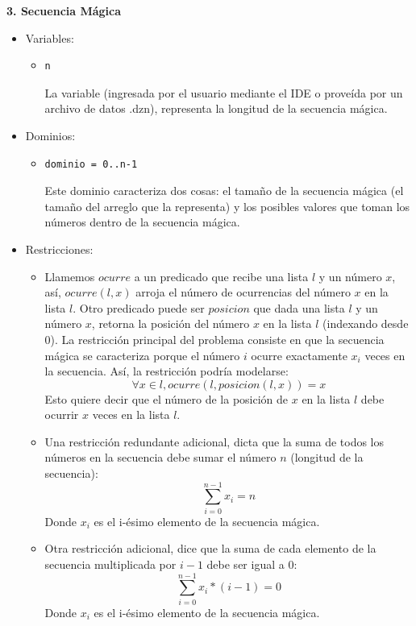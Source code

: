 \documentclass[12pt]{article}
\begin{document}
\newpage

\begin{flushleft}
\textbf{3. Secuencia Mágica}
\end{flushleft}

\begin{itemize}
\item Variables:
\begin{itemize}
\item \begin{verbatim}
n
\end{verbatim} La variable (ingresada por el usuario mediante el IDE o proveída por un archivo de datos .dzn), representa la longitud de la secuencia mágica.
\end{itemize}
\item Dominios:
\begin{itemize}
\item \begin{verbatim}
dominio = 0..n-1
\end{verbatim} Este dominio caracteriza dos cosas: el tamaño de la secuencia mágica (el tamaño del arreglo que la representa) y los posibles valores que toman los números dentro de la secuencia mágica.
\end{itemize}
\item Restricciones:
\begin{itemize}
\item Llamemos $ocurre$ a un predicado que recibe una lista $l$ y un número $x$, así, $ocurre(l,x)$ arroja el número de ocurrencias del número $x$ en la lista $l$. Otro predicado puede ser $posicion$ que dada una lista $l$ y un número $x$, retorna la posición del número $x$ en la lista $l$ (indexando desde 0). La restricción principal del problema consiste en que la secuencia mágica se caracteriza porque el número $i$ ocurre exactamente $x_{i}$ veces en la secuencia. Así, la restricción podría modelarse:
\begin{equation*}
\forall x \in l, ocurre(l, posicion(l, x)) = x
\end{equation*}
Esto quiere decir que el número de la posición de $x$ en la lista $l$ debe ocurrir $x$ veces en la lista $l$.
\item Una restricción redundante adicional, dicta que la suma de todos los números en la secuencia debe sumar el número $n$ (longitud de la secuencia):
\begin{equation*}
\sum_{i=0}^{n-1} x_{i} = n
\end{equation*}
Donde $x_{i}$ es el i-ésimo elemento de la secuencia mágica.
\item Otra restricción adicional, dice que la suma de cada elemento de la secuencia multiplicada por $i-1$ debe ser igual a 0:
\begin{equation*}
\sum_{i=0}^{n-1} x_{i}*(i-1) = 0
\end{equation*}
Donde $x_{i}$ es el i-ésimo elemento de la secuencia mágica.
\end{itemize}
\end{itemize}
\end{document}
